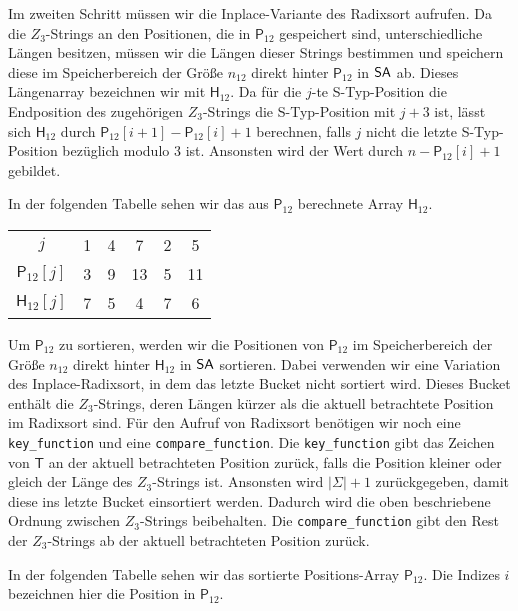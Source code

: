 Im zweiten Schritt müssen wir die Inplace-Variante des Radixsort aufrufen. Da die $Z_3$-Strings an den Positionen, die in $\mathsf{P}_{12}$ gespeichert sind, unterschiedliche Längen besitzen, müssen wir die Längen dieser Strings bestimmen und speichern diese im Speicherbereich der Größe $n_{12}$ direkt hinter $\mathsf{P}_{12}$ in $\sa$ ab. Dieses Längenarray bezeichnen wir mit $\mathsf{H}_{12}$. Da für die $j$-te S-Typ-Position die Endposition des zugehörigen $Z_3$-Strings die S-Typ-Position mit $j+3$ ist, lässt sich $\mathsf{H}_{12}$ durch $\mathsf{P}_{12}[i+1]-\mathsf{P}_{12}[i]+1$ berechnen, falls $j$ nicht die letzte S-Typ-Position bezüglich modulo $3$ ist. Ansonsten wird der Wert durch $n-\mathsf{P}_{12}[i]+1$ gebildet. \par
In der folgenden Tabelle sehen wir das aus $\mathsf{P}_{12}$ berechnete Array $\mathsf{H}_{12}$.

\begin{table}[H]
	\footnotesize
	\centering
	\begin{tabular}{c| c c c || c c }
		$j$ & 1 & 4 & 7 & 2 & 5 \\
		$\mathsf{P}_{12}[j]$ & 3 & 9 & 13 & 5 & 11 \\
		$\mathsf{H}_{12}[j]$ & 7 & 5 & 4 & 7 & 6 
	\end{tabular}
\end{table}

Um $\mathsf{P}_{12}$ zu sortieren, werden wir die Positionen von $\mathsf{P}_{12}$ im Speicherbereich der Größe $n_{12}$ direkt hinter $\mathsf{H}_{12}$ in $\sa$ sortieren. Dabei verwenden wir eine Variation des Inplace-Radixsort, in dem das letzte Bucket nicht sortiert wird. Dieses Bucket enthält die $Z_3$-Strings, deren Längen kürzer als die aktuell betrachtete Position im Radixsort sind. Für den Aufruf von Radixsort benötigen wir noch eine \texttt{key\_function} und eine \texttt{compare\_function}. Die \texttt{key\_function} gibt das Zeichen von $\mathsf{T}$ an der aktuell betrachteten Position zurück, falls die Position kleiner oder gleich der Länge des $Z_3$-Strings ist. Ansonsten wird $|\Sigma| +1$ zurückgegeben, damit diese ins letzte Bucket einsortiert werden. Dadurch wird die oben beschriebene Ordnung zwischen $Z_3$-Strings beibehalten. Die \texttt{compare\_function} gibt den Rest der $Z_3$-Strings ab der aktuell betrachteten Position zurück. \par
In der folgenden Tabelle sehen wir das sortierte Positions-Array $\mathsf{P}_{12}$. Die Indizes $i$ bezeichnen hier die Position in $\mathsf{P}_{12}$.

